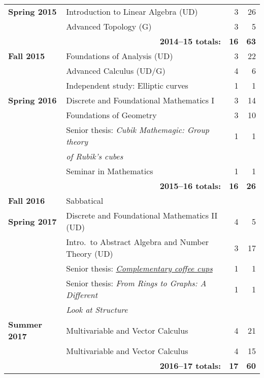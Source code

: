 \documentclass[12pt]{article}
\begin{document}
\begin{center}
\begin{longtable}{@{} l @{\hspace{1ex}} l @{} rr @{}}
\textbf{Spring 2015} & Introduction to Linear Algebra (UD) & 3 & 26 \\
 & Advanced Topology (G) & 3 & 5 \\
 \cmidrule{2-4}
 & \multicolumn{1}{r}{\textbf{2014--15 totals:}} & \textbf{16} & \textbf{63} \\
 \cmidrule{2-4}

\textbf{Fall 2015} & Foundations of Analysis (UD) & 3 & 22 \\
 & Advanced Calculus (UD/G) & 4 & 6 \\
 & Independent study: Elliptic curves & 1 & 1 \\
\addlinespace[0.1in]

\textbf{Spring 2016} & Discrete and Foundational Mathematics I & 3 & 14 \\
 & Foundations of Geometry & 3 & 10 \\
 & Senior thesis: \emph{Cubik Mathemagic: Group theory} & 1 & 1 \\
 & \qquad \emph{of Rubik's cubes} & & \\
 & Seminar in Mathematics & 1 & 1 \\

 \cmidrule{2-4}
 & \multicolumn{1}{r}{\textbf{2015--16 totals:}} & \textbf{16} & \textbf{26} \\
 \cmidrule{2-4}

\textbf{Fall 2016} & Sabbatical & & \\
\addlinespace[0.1in]

\textbf{Spring 2017} & Discrete and Foundational Mathematics II (UD) & 4 & 5 \\
 & Intro.\ to Abstract Algebra and Number Theory (UD) & 3 & 17 \\
 & Senior thesis: \href{https://scholarworks.boisestate.edu/math_undergraduate_theses/6/}{\emph{Complementary coffee cups}} & 1 & 1 \\
 & Senior thesis: \emph{From Rings to Graphs: A Different} & 1 & 1 \\
 & \qquad \emph{Look at Structure} & & \\
\addlinespace[0.1in]

\textbf{Summer 2017} & Multivariable and Vector Calculus & 4 & 21 \\
                     & Multivariable and Vector Calculus & 4 & 15 \\

 \cmidrule{2-4}
 & \multicolumn{1}{r}{\textbf{2016--17 totals:}} & \textbf{17} & \textbf{60} \\
  \cmidrule{2-4}


\end{longtable}
\end{center}
\end{document}
